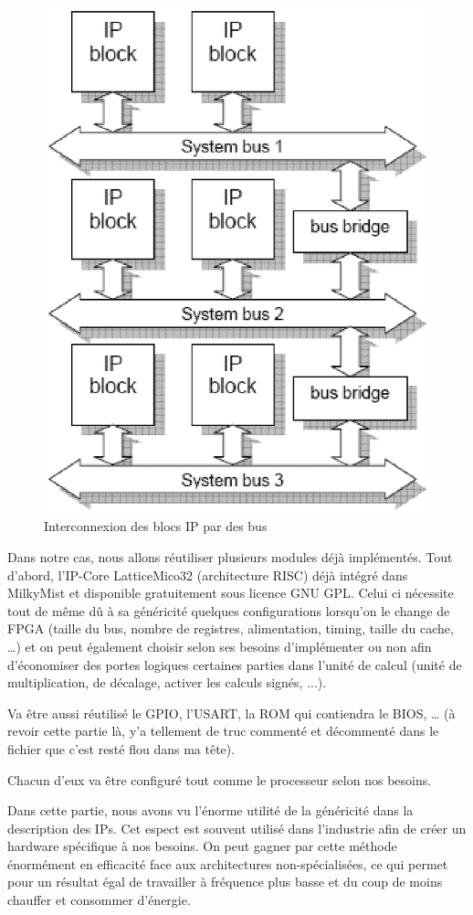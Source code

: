 \begin{figure}
\begin{center}
\includegraphics[scale=0.4]{soc_interconnect.eps}
\end{center}
\caption{Interconnexion des blocs IP par des bus}
\end{figure}

Dans notre cas, nous allons réutiliser plusieurs modules déjà implémentés. Tout d'abord, l'IP-Core LatticeMico32 (architecture RISC) déjà intégré dans MilkyMist et disponible gratuitement sous licence GNU GPL. Celui ci nécessite tout de même dû à sa généricité quelques configurations lorsqu'on le change de FPGA (taille du bus, nombre de registres, alimentation, timing, taille du cache, …) et on peut également choisir selon ses besoins d'implémenter ou non afin d'économiser des portes logiques certaines parties dans l'unité de calcul (unité de multiplication, de décalage, activer les calculs signés, ...).
\medskip

Va être aussi réutilisé le GPIO, l'USART, la ROM qui contiendra le BIOS, … (à revoir cette partie là, y'a tellement de truc commenté et décommenté dans le fichier que c'est resté flou dans ma tête).
\medskip

Chacun d'eux va être configuré tout comme le processeur selon nos besoins.
\medskip

Dans cette partie, nous avons vu l'énorme utilité de la généricité dans la description des IPs. Cet espect est souvent utilisé dans l'industrie afin de créer un hardware spécifique à nos besoins. On peut gagner par cette méthode énormément en efficacité face aux architectures non-spécialisées, ce qui permet pour un résultat égal de travailler à fréquence plus basse et du coup de moins chauffer et consommer d'énergie.
\medskip